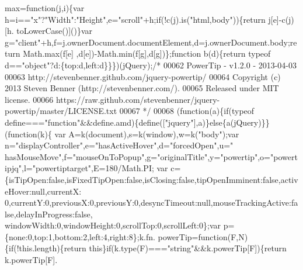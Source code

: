 \begin{DoxyCode}
{      max=\textcolor{keyword}{function}(j,i)\{var h=i==\textcolor{stringliteral}{"x"}?\textcolor{stringliteral}{"Width"}:\textcolor{stringliteral}{"Height"},e=\textcolor{stringliteral}{"scroll"}+h;\textcolor{keywordflow}{if}(!c(j).is(\textcolor{stringliteral}{"html,body"}))\{\textcolor{keywordflow}{return} j[e]-c(j)[h.
      toLowerCase()]()\}var g=\textcolor{stringliteral}{"client"}+h,f=j.ownerDocument.documentElement,d=j.ownerDocument.body;\textcolor{keywordflow}{return} Math.max(f[e]
      ,d[e])-Math.min(f[g],d[g])\};\textcolor{keyword}{function} b(d)\{\textcolor{keywordflow}{return} typeof d==\textcolor{stringliteral}{"object"}?d:\{top:d,left:d\}\}\})(jQuery);\textcolor{comment}{/*}
00062 \textcolor{comment}{ PowerTip - v1.2.0 - 2013-04-03}
00063 \textcolor{comment}{ http://stevenbenner.github.com/jquery-powertip/}
00064 \textcolor{comment}{ Copyright (c) 2013 Steven Benner (http://stevenbenner.com/).}
00065 \textcolor{comment}{ Released under MIT license.}
00066 \textcolor{comment}{ https://raw.github.com/stevenbenner/jquery-powertip/master/LICENSE.txt}
00067 \textcolor{comment}{*/}
00068 (\textcolor{keyword}{function}(a)\{\textcolor{keywordflow}{if}(typeof define===\textcolor{stringliteral}{"function"}&&define.amd)\{define([\textcolor{stringliteral}{"jquery"}],a)\}\textcolor{keywordflow}{else}\{a(jQuery)\}\}(\textcolor{keyword}{function}(k)\{
      var A=k(document),s=k(window),w=k(\textcolor{stringliteral}{"body"});var n=\textcolor{stringliteral}{"displayController"},e=\textcolor{stringliteral}{"hasActiveHover"},d=\textcolor{stringliteral}{"forcedOpen"},u=\textcolor{stringliteral}{"
      hasMouseMove"},f=\textcolor{stringliteral}{"mouseOnToPopup"},g=\textcolor{stringliteral}{"originalTitle"},y=\textcolor{stringliteral}{"powertip"},o=\textcolor{stringliteral}{"powertipjq"},l=\textcolor{stringliteral}{"powertiptarget"},E=180/Math.PI;
      var c=\{isTipOpen:\textcolor{keyword}{false},isFixedTipOpen:\textcolor{keyword}{false},isClosing:\textcolor{keyword}{false},tipOpenImminent:\textcolor{keyword}{false},activeHover:null,currentX:
      0,currentY:0,previousX:0,previousY:0,desyncTimeout:null,mouseTrackingActive:\textcolor{keyword}{false},delayInProgress:\textcolor{keyword}{false},
      windowWidth:0,windowHeight:0,scrollTop:0,scrollLeft:0\};var p=\{none:0,top:1,bottom:2,left:4,right:8\};k.fn.
      powerTip=\textcolor{keyword}{function}(F,N)\{\textcolor{keywordflow}{if}(!this.length)\{\textcolor{keywordflow}{return} \textcolor{keyword}{this}\}\textcolor{keywordflow}{if}(k.type(F)===\textcolor{stringliteral}{"string"}&&k.powerTip[F])\{\textcolor{keywordflow}{return} k.powerTip[F].
}
\end{DoxyCode}
